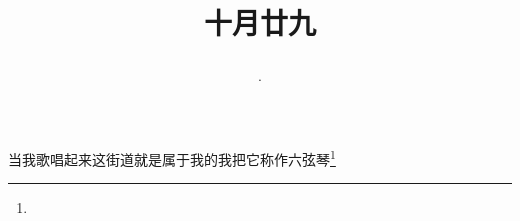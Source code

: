 \title{\date[d=29,m=11,y=2024][year:cn-y,年,month:cn,day:cn,日,·,weekday]·十月廿九 }
当我歌唱起来这街道就是属于我的我把它称作六弦琴\footnote{ }

